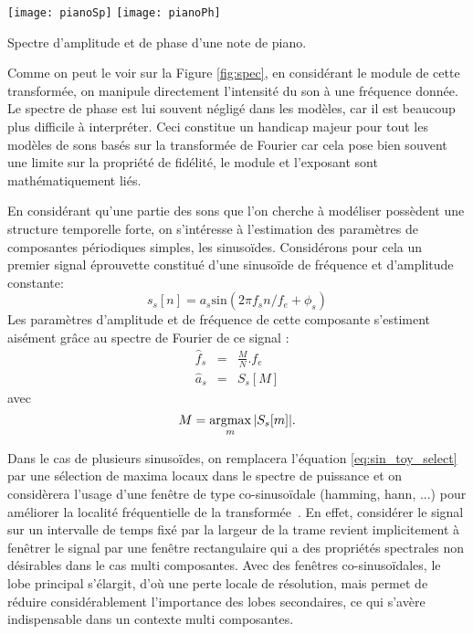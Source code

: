 \begin{marginfigure}
  \texttt{[image: pianoSp]}
  \texttt{[image: pianoPh]}
  \caption{Spectre d'amplitude et de phase d'une note de piano.}
  \label{fig:spec}
\end{marginfigure}

Comme on peut le voir sur la Figure \ref{fig:spec}, en considérant le module de cette transformée, on manipule directement l'intensité du son à une fréquence donnée. Le spectre de phase est lui souvent négligé dans les modèles, car il est beaucoup plus difficile à interpréter. Ceci constitue un handicap majeur pour tout les modèles de sons basés sur la transformée de Fourier car cela pose bien souvent une limite sur la propriété de fidélité, le module et l'exposant sont mathématiquement liés.


En considérant qu'une partie des sons que l'on cherche à modéliser possèdent une structure temporelle forte, on s'intéresse à l'estimation des paramètres de composantes périodiques simples, les sinusoïdes. Considérons pour cela un premier signal \og éprouvette \fg constitué d'une sinusoïde de fréquence et d'amplitude constante:
\begin{equation}
  s_s[n] = a_s \mathrm{sin}(2\pi f_s n /f_e + \phi_s)
  \label{eq:sin_toy}
\end{equation}
Les paramètres d'amplitude et de fréquence de cette composante s'estiment aisément grâce au spectre de Fourier de ce signal :
\begin{eqnarray}
  \hat{f}_s &=&  \frac{M}{N} . f_e\\
  \hat{a}_s &=& S_s[M]
    \label{eq:sin_toy_est}
\end{eqnarray}
avec
\begin{equation}
  M = \operatorname*{argmax}_m | S_s[m] |.
  \label{eq:sin_toy_select}
\end{equation}

Dans le cas de plusieurs sinusoïdes, on remplacera l'équation \ref{eq:sin_toy_select} par une sélection de maxima locaux dans le spectre de puissance et on considèrera l'usage d'une fenêtre de type co-sinusoïdale (hamming, hann, ...) pour améliorer la localité fréquentielle de la transformée~\cite{harris1978use}. En effet, considérer le signal sur un intervalle de temps fixé par la largeur de la trame revient implicitement à fenêtrer le signal par une fenêtre rectangulaire qui a des propriétés spectrales non désirables dans le cas multi composantes. Avec des fenêtres co-sinusoïdales, le lobe principal s'élargit, d'où une perte locale de résolution, mais permet de réduire considérablement l'importance des lobes secondaires, ce qui s'avère indispensable dans un contexte multi composantes.

